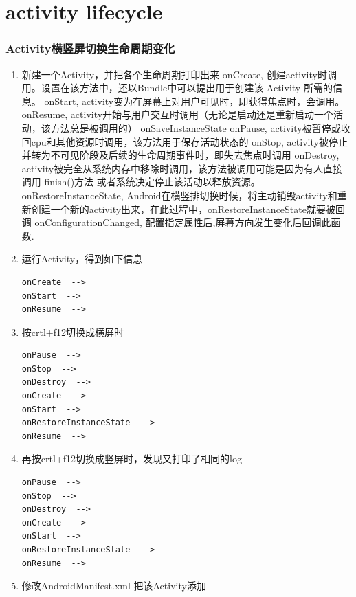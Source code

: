 \documentclass[9pt, b5paaper]{book}
\begin{document}
\chapter{activity lifecycle}
\label{sec-5}
\subsection{Activity横竖屏切换生命周期变化}
\label{sec-5-0-1}
\begin{enumerate}
\item 新建一个Activity，并把各个生命周期打印出来
\label{sec-5-0-1-1}
onCreate,
创建activity时调用。设置在该方法中，还以Bundle中可以提出用于创建该 Activity 所需的信息。
onStart,
activity变为在屏幕上对用户可见时，即获得焦点时，会调用。
onResume,
activity开始与用户交互时调用（无论是启动还是重新启动一个活动，该方法总是被调用的）
onSaveInstanceState
onPause,
activity被暂停或收回cpu和其他资源时调用，该方法用于保存活动状态的
onStop,
activity被停止并转为不可见阶段及后续的生命周期事件时，即失去焦点时调用
onDestroy,
activity被完全从系统内存中移除时调用，该方法被调用可能是因为有人直接调用 finish()方法 或者系统决定停止该活动以释放资源。
onRestoreInstanceState,
Android在横竖排切换时候，将主动销毁activity和重新创建一个新的activity出来，在此过程中，onRestoreInstanceState就要被回调
onConfigurationChanged,
配置指定属性后,屏幕方向发生变化后回调此函数.
\item 运行Activity，得到如下信息
\label{sec-5-0-1-2}
\begin{verbatim}
onCreate  -->
onStart  -->
onResume  -->
\end{verbatim}
\item 按crtl+f12切换成横屏时
\label{sec-5-0-1-3}
\begin{verbatim}
onPause  -->
onStop  -->
onDestroy  -->
onCreate  -->
onStart  -->
onRestoreInstanceState  -->
onResume  -->
\end{verbatim}
\item 再按crtl+f12切换成竖屏时，发现又打印了相同的log
\label{sec-5-0-1-4}
\begin{verbatim}
onPause  -->
onStop  -->
onDestroy  -->
onCreate  -->
onStart  -->
onRestoreInstanceState  -->
onResume  -->
\end{verbatim}
\item 修改AndroidManifest.xml
\label{sec-5-0-1-5}
把该Activity添加
\begin{verbatim}

\end{verbatim}
\end{enumerate}
\end{document}
